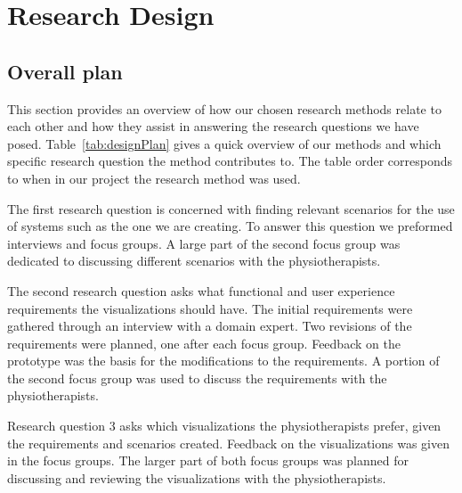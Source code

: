 \chapter{Research Design}
\label{ch:researchDesign}
\section{Overall plan}
\label{sec:overview}

This section provides an overview of how our chosen research methods relate to each other and how they assist in answering the research questions we have posed. Table~\ref{tab:designPlan} gives a quick overview of our methods and which specific research question the method contributes to. The table order corresponds to when in our project the research method was used.

The first research question is concerned with finding relevant scenarios for the use of systems such as the one we are creating. To answer this question we preformed interviews and focus groups. A large part of the second focus group was dedicated to discussing different scenarios with the physiotherapists.

The second research question asks what functional and user experience requirements the visualizations should have. The initial requirements were gathered through an interview with a domain expert. Two revisions of the requirements were planned, one after each focus group. Feedback on the prototype was the basis for the modifications to the requirements. A portion of the second focus group was used to discuss the requirements with the physiotherapists.

Research question 3 asks which visualizations the physiotherapists prefer, given the requirements and scenarios created. Feedback on the visualizations was given in the focus groups. The larger part of both focus groups was planned for discussing and reviewing the visualizations with the physiotherapists. 

